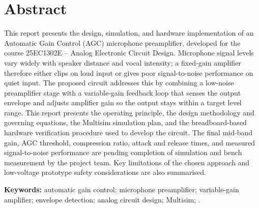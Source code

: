 \chapter*{Abstract}

This report presents the design, simulation, and hardware implementation of an Automatic Gain Control (AGC) microphone preamplifier, developed for the course 25EC1302E -- Analog Electronic Circuit Design. Microphone signal levels vary widely with speaker distance and vocal intensity; a fixed-gain amplifier therefore either clips on loud input or gives poor signal-to-noise performance on quiet input. The proposed circuit addresses this by combining a low-noise preamplifier stage with a variable-gain feedback loop that senses the output envelope and adjusts amplifier gain so the output stays within a target level range. This report presents the operating principle, the design methodology and governing equations, the Multisim simulation plan, and the breadboard-based hardware verification procedure used to develop the circuit. The final mid-band gain, AGC threshold, compression ratio, attack and release times, and measured signal-to-noise performance are  pending completion of simulation and bench measurement by the project team. Key limitations of the chosen approach and low-voltage prototype safety considerations are also summarised.

\vspace{0.5cm}
\noindent\textbf{Keywords:} automatic gain control; microphone preamplifier; variable-gain amplifier; envelope detection; analog circuit design; Multisim; .
